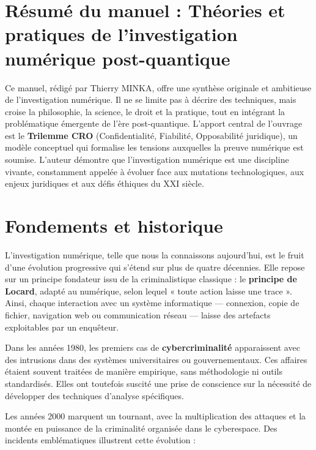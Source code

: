 \documentclass[memoire, 12pt]{report}
\begin{document}
\newpage

\section*{Résumé du manuel : Théories et pratiques de l’investigation numérique post-quantique}

Ce manuel, rédigé par Thierry MINKA, offre une synthèse originale et ambitieuse de l’investigation numérique. 
Il ne se limite pas à décrire des techniques, mais croise la philosophie, la science, le droit et la pratique, 
tout en intégrant la problématique émergente de l’ère post-quantique. 
L’apport central de l’ouvrage est le \textbf{Trilemme CRO} (Confidentialité, Fiabilité, Opposabilité juridique), 
un modèle conceptuel qui formalise les tensions auxquelles la preuve numérique est soumise. 
L’auteur démontre que l’investigation numérique est une discipline vivante, 
constamment appelée à évoluer face aux mutations technologiques, aux enjeux juridiques 
et aux défis éthiques du XXI siècle.  

\section*{Fondements et historique}

L’investigation numérique, telle que nous la connaissons aujourd’hui, est le fruit 
d’une évolution progressive qui s’étend sur plus de quatre décennies. 
Elle repose sur un principe fondateur issu de la criminalistique classique : 
le \textbf{principe de Locard}, adapté au numérique, selon lequel 
« toute action laisse une trace ». 
Ainsi, chaque interaction avec un système informatique — connexion, copie de fichier, 
navigation web ou communication réseau — laisse des artefacts exploitables 
par un enquêteur.  

Dans les années 1980, les premiers cas de \textbf{cybercriminalité} apparaissent 
avec des intrusions dans des systèmes universitaires ou gouvernementaux. 
Ces affaires étaient souvent traitées de manière empirique, sans méthodologie ni outils standardisés. 
Elles ont toutefois suscité une prise de conscience sur la nécessité de développer 
des techniques d’analyse spécifiques.  

Les années 2000 marquent un tournant, avec la multiplication des attaques et 
la montée en puissance de la criminalité organisée dans le cyberespace. 
Des incidents emblématiques illustrent cette évolution :  
\end{document}
